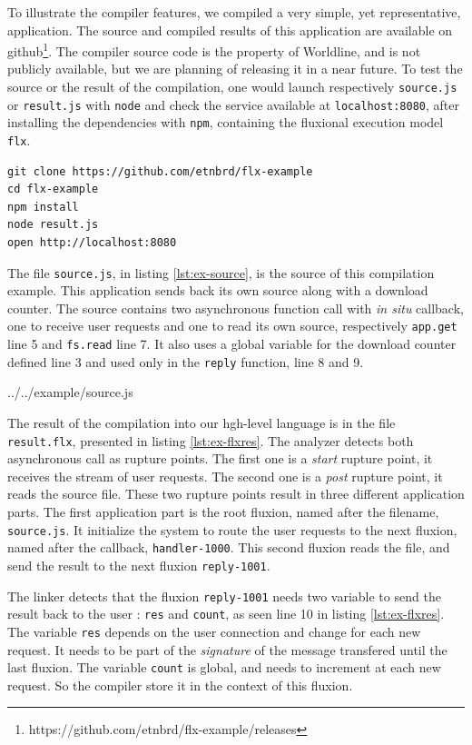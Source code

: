 To illustrate the compiler features, we compiled a very simple, yet representative, application.
The source and compiled results of this application are available on github\cite{flx-example}\footnote{\raggedright https://github.com/etnbrd/flx-example/releases}.
The compiler source code is the property of Worldline, and is not publicly available, but we are planning of releasing it in a near future.
To test the source or the result of the compilation, one would launch respectively \texttt{source.js} or \texttt{result.js} with \texttt{node} and check the service available at \texttt{localhost:8080}, after installing the dependencies with \texttt{npm}, containing the fluxional execution model \texttt{flx}.
\begin{verbatim}
git clone https://github.com/etnbrd/flx-example
cd flx-example
npm install
node result.js
open http://localhost:8080
\end{verbatim}

The file \texttt{source.js}, in listing \ref{lst:ex-source}, is the source of this compilation example.
This application sends back its own source along with a download counter.
The source contains two asynchronous function call with \textit{in situ} callback, one to receive user requests and one to read its own source, respectively \texttt{app.get} line 5 and \texttt{fs.read} line 7.
It also uses a global variable for the download counter defined line 3 and used only in the \texttt{reply} function, line 8 and 9.

{../../example/source.js}

The result of the compilation into our hgh-level language is in the file \texttt{result.flx}, presented in listing \ref{lst:ex-flxres}.
The analyzer detects both asynchronous call as rupture points.
The first one is a \textit{start} rupture point, it receives the stream of user requests. 
The second one is a \textit{post} rupture point, it reads the source file.
These two rupture points result in three different application parts.
The first application part is the root fluxion, named after the filename, \texttt{source.js}.
It initialize the system to route the user requests to the next fluxion, named after the callback, \texttt{handler-1000}.
This second fluxion reads the file, and send the result to the next fluxion \texttt{reply-1001}.

The linker detects that the fluxion \texttt{reply-1001} needs two variable to send the result back to the user : \texttt{res} and \texttt{count}, as seen line 10 in listing \ref{lst:ex-flxres}.
The variable \texttt{res} depends on the user connection and change for each new request.
It needs to be part of the \textit{signature} of the message transfered until the last fluxion.
The variable \texttt{count} is global, and needs to increment at each new request.
So the compiler store it in the context of this fluxion.

